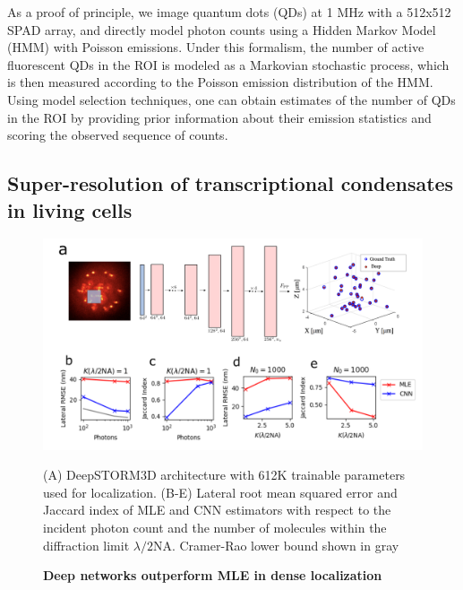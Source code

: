 \documentclass{ucetd}
\begin{document}
As a proof of principle, we image quantum dots (QDs) at 1 MHz with a 512x512 SPAD array, and directly model photon counts using a Hidden Markov Model (HMM) with Poisson emissions. Under this formalism, the number of active fluorescent QDs in the ROI is modeled as a Markovian stochastic process, which is then measured according to the Poisson emission distribution of the HMM. Using model selection techniques, one can obtain estimates of the number of QDs in the ROI by providing prior information about their emission statistics and scoring the observed sequence of counts. 


\subsection{Super-resolution of transcriptional condensates in living cells}

\begin{figure}
\includegraphics[width=15cm]{PSF2D.png}
\caption{\textbf{Deep networks outperform MLE in dense localization}} (A) DeepSTORM3D architecture with 612K trainable parameters used for localization. (B-E) Lateral root mean squared error and Jaccard index of MLE and CNN estimators with respect to the incident photon count and the number of molecules within the diffraction limit $\lambda/2\mathrm{NA}$. Cramer-Rao lower bound shown in gray\end{figure}
\end{document}
